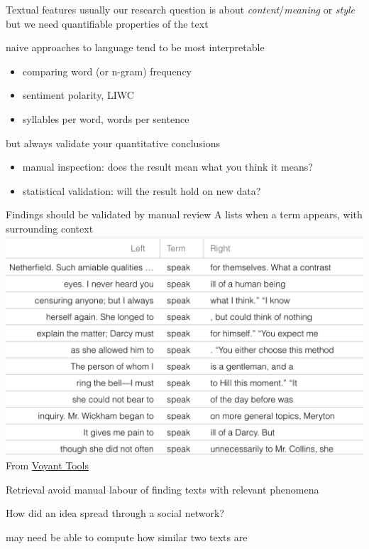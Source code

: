 \begin{points}{Textual features}
	\p usually our research question is about \emph{content}/\emph{meaning} or \emph{style}
	\p but we need quantifiable properties of the text
	\vfill

    \p naive approaches to language  tend to be most interpretable
	\begin{itemize}
		\item comparing word (or n-gram) frequency
		\item sentiment polarity, LIWC
		\item syllables per word, words per sentence
	\end{itemize}
    \p but always validate your quantitative conclusions
	\begin{itemize}
		\item manual inspection: does the result mean what you think it means?
		\item statistical validation: will the result hold on new data?
	\end{itemize}
\end{points}

\begin{centre}{Findings should be validated by manual review} 
	A  lists when a term appears, with surrounding context\\
	\href{https://books.google.com/ngrams}{\includegraphics[width=.8\textwidth]{fig/concordance}}\\
	From \href{http://voyant-tools.org/}{Voyant Tools}
\end{centre}

\begin{points}{Retrieval}
    \p avoid manual labour of finding texts with relevant phenomena
	\begin{itemize}
		\p How did an idea spread through a social network?
	\end{itemize}
	\item may need be able to compute how similar two texts are
\end{points}

